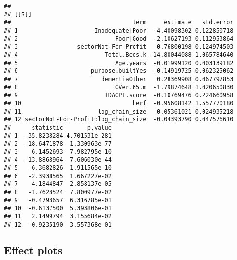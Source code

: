 \documentclass[]{article}
\begin{document}
\begin{verbatim}
## 
## [[5]]
##                                   term     estimate   std.error
## 1                      Inadequate|Poor  -4.40098302 0.122850718
## 2                            Poor|Good  -2.10627193 0.112953864
## 3                 sectorNot-For-Profit   0.76800198 0.124974503
## 4                         Total.Beds.k -14.80044088 1.065784640
## 5                            Age.years  -0.01999120 0.003139182
## 6                     purpose.builtYes  -0.14919725 0.062325062
## 7                        dementiaOther   0.28369908 0.067797853
## 8                            OVer.65.m  -1.79874648 1.020650830
## 9                         IDAOPI.score  -0.10769476 0.224660958
## 10                                herf  -0.95608142 1.557770180
## 11                      log_chain_size   0.05361021 0.024935218
## 12 sectorNot-For-Profit:log_chain_size  -0.04393790 0.047576610
##      statistic       p.value
## 1  -35.8238284 4.701531e-281
## 2  -18.6471878  1.330963e-77
## 3    6.1452693  7.982795e-10
## 4  -13.8868964  7.606030e-44
## 5   -6.3682826  1.911565e-10
## 6   -2.3938565  1.667227e-02
## 7    4.1844847  2.858137e-05
## 8   -1.7623524  7.800977e-02
## 9   -0.4793657  6.316785e-01
## 10  -0.6137500  5.393806e-01
## 11   2.1499794  3.155684e-02
## 12  -0.9235190  3.557368e-01
\end{verbatim}

\subsection{Effect plots}\label{effect-plots}
\end{document}
